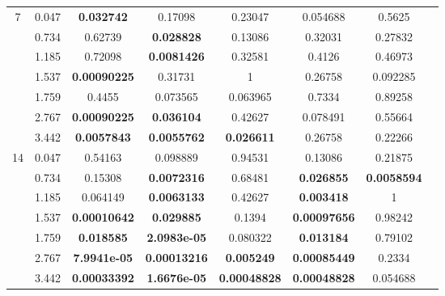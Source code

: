 \begin{table}[H]
\begin{center}
\begin{tabular}{cccccccc}
         7 & 0.047     & \textbf{0.032742}                    & 0.17098                   & 0.23047                   & 0.054688          & 0.5625 \\
           & 0.734      & 0.62739                     & \textbf{0.028828}                  & 0.13086                   & 0.32031           & 0.27832 \\
           & 1.185       & 0.72098                     & \textbf{0.0081426}                 & 0.32581                   & 0.4126            & 0.46973 \\
           & 1.537       & \textbf{0.00090225}                  & 0.31731                   & 1                         & 0.26758           & 0.092285 \\
           & 1.759        & 0.4455                      & 0.073565                  & 0.063965                  & 0.7334            & 0.89258 \\
           & 2.767       & \textbf{0.00090225}                  & \textbf{0.036104}                  & 0.42627                   & 0.078491          & 0.55664 \\
           & 3.442        & \textbf{0.0057843}                   & \textbf{0.0055762}                 & \textbf{0.026611}                  & 0.26758           & 0.22266 \\
        

        14 & 0.047     & 0.54163                     & 0.098889                  & 0.94531                   & 0.13086           & 0.21875 \\
           & 0.734      & 0.15308                     & \textbf{0.0072316}                 & 0.68481                   & \textbf{0.026855}          & \textbf{0.0058594} \\
           & 1.185       & 0.064149           & \textbf{0.0063133}                 & 0.42627                   & \textbf{0.003418}          & 1 \\
           & 1.537       & \textbf{0.00010642}         & \textbf{0.029885}                  & 0.1394                    & \textbf{0.00097656}        & 0.98242 \\
           & 1.759        & \textbf{0.018585}           & \textbf{2.0983e-05}                & 0.080322                  & \textbf{0.013184}          & 0.79102 \\
           & 2.767       & \textbf{7.9941e-05}         & \textbf{0.00013216}                &  \textbf{0.005249}                  & \textbf{0.00085449}        & 0.2334 \\
           & 3.442        & \textbf{0.00033392}         & \textbf{1.6676e-05}                & \textbf{0.00048828}                & \textbf{0.00048828}        & 0.054688 \\
      \bottomrule
    \end{tabular}
  \end{center}
\end{table}

